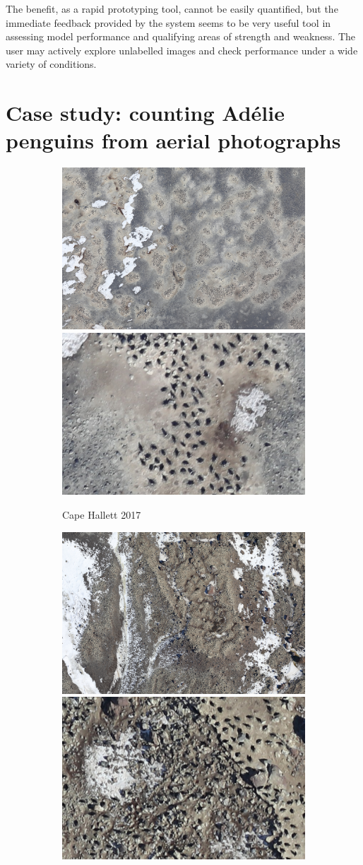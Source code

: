 The benefit, as a rapid prototyping tool, cannot be easily quantified, but the immediate feedback provided by the system seems to be very useful tool in assessing model performance and qualifying areas of strength and weakness. The user may actively explore unlabelled images and check performance under a wide variety of conditions.


\section{Case study: counting Ad\'elie penguins from aerial photographs}
\label{sec:case_penguins}

\begin{figure}[ht!]
\centering
\begin{subfigure}[t]{1.0\linewidth}
  \includegraphics[width=0.475\linewidth]{figures/annotation/penguin/hallet_large.jpg}
  \hfill
  \includegraphics[width=0.475\linewidth]{figures/annotation/penguin/hallet.jpg}
  \caption{Cape Hallett 2017}
\end{subfigure}
\begin{subfigure}[t]{1.0\linewidth}
  \includegraphics[width=0.475\linewidth]{figures/annotation/penguin/cotter_large.jpg}
  \hfill 
  \includegraphics[width=0.475\linewidth]{figures/annotation/penguin/cotter.jpg}

\end{subfigure}
\end{figure}

